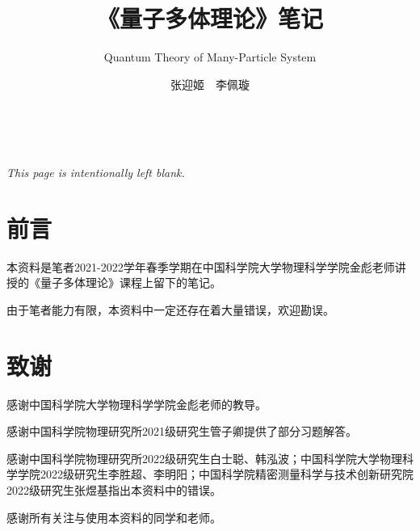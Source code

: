 \documentclass[cn,11pt,blue,hide]{elegantbook}
\title{《量子多体理论》笔记}
\subtitle{Quantum Theory of Many-Particle System}
\author{张迎姬~~李佩璇}
\institute{中国科学院物理研究所}
\begin{document}
\maketitle
\thispagestyle{empty}

\newpage
\thispagestyle{empty}
~
\vspace{6.5cm}
\begin{center}
{\erhao\textit{This page is intentionally left blank.}}
\end{center}


\newpage
{}
\chapter*{前\hspace{2em}言}
本资料是笔者2021-2022学年春季学期在中国科学院大学物理科学学院金彪老师讲授的《量子多体理论》课程上留下的笔记。

由于笔者能力有限，本资料中一定还存在着大量错误，欢迎勘误。

\newpage


\chapter*{致\hspace{2em}谢}
感谢中国科学院大学物理科学学院金彪老师的教导。

感谢中国科学院物理研究所2021级研究生管子卿提供了部分习题解答。

感谢中国科学院物理研究所2022级研究生白士聪、韩泓波；中国科学院大学物理科学学院2022级研究生李胜超、李明阳；中国科学院精密测量科学与技术创新研究院2022级研究生张煜基指出本资料中的错误。

感谢所有关注与使用本资料的同学和老师。

\tableofcontents


\mainmatter
\hypersetup{pageanchor=true}

%






\appendix
\renewcommand{\chaptermark}[1]{\markboth{\appendixname \; #1\;}{}}





% 
% 
\end{document}
